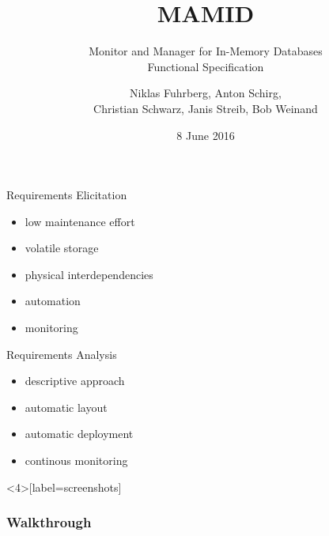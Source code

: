 \documentclass[11pt,aspectratio=169]{beamer}
\begin{document}
	\author{Niklas Fuhrberg, Anton Schirg,\\ Christian Schwarz, Janis Streib, Bob Weinand}
	\title{MAMID}
	\subtitle{Monitor and Manager for In-Memory Databases\\Functional Specification}
	\date{8 June 2016}
	\subject{Functional Specification}
	\frame[plain]{\maketitle}
	
	\begin{frame}{Requirements Elicitation}
		\begin{itemize}
			\item low maintenance effort
			\item volatile storage
			\item physical interdependencies
			\item automation
			\item monitoring
		\end{itemize}
	\end{frame}
	
	
	\begin{frame}{Requirements Analysis}
		\begin{itemize}
			\item descriptive approach
			\item automatic layout
			\item automatic deployment
			\item continous monitoring
		\end{itemize}
	\end{frame}
	
	\begin{frame}[label=screenshots]
		\frametitle{Walkthrough}
		\begin{center}
		\end{center}
	\end{frame}
	
\end{document}
